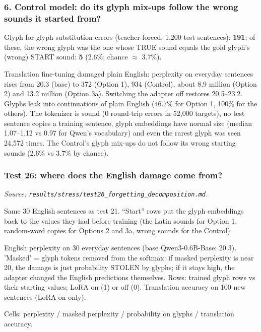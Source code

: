 \documentclass[10pt,a4paper,oneside]{article}
\begin{document}
\subsubsection*{6. Control model: do its glyph mix-ups follow the wrong sounds it started from?}

Glyph-for-glyph substitution errors (teacher-forced, 1,200 test sentences): \textbf{191}; of these, the wrong glyph was the one whose TRUE sound equals the gold glyph's (wrong) START sound: \textbf{5} (2.6\%; chance $\approx$ 3.7\%).

\begin{infer}Translation fine-tuning damaged plain English: perplexity on everyday sentences rises from 20.3 (base) to 372
(Option 1), 934 (Control), about 8.9 million (Option 2) and 13.2 million (Option 3a). Switching the adapter off
restores 20.5--23.2. Glyphs leak into continuations of plain English (46.7\% for Option 1, 100\% for the others).
The tokenizer is sound (0 round-trip errors in 52,000 targets), no test sentence copies a training sentence, glyph
embeddings have normal size (median 1.07--1.12 vs 0.97 for Qwen's vocabulary) and even the rarest glyph was seen
24,572 times. The Control's glyph mix-ups do not follow its wrong starting sounds (2.6\% vs 3.7\% by chance).\end{infer}
\subsubsection{Test 26: where does the English damage come from?}
\textit{Source: \texttt{results/stress/test26\_forgetting\_decomposition.md}.}


\begin{caveat}Same 30 English sentences as test 21. ``Start'' rows put the glyph embeddings back to the values they had
before training (the Latin sounds for Option 1, random-word copies for Options 2 and 3a, wrong sounds for the
Control).\end{caveat}
English perplexity on 30 everyday sentences (base Qwen3-0.6B-Base: 20.3). 'Masked' = glyph tokens removed from the softmax: if masked perplexity is near 20, the damage is just probability STOLEN by glyphs; if it stays high, the adapter changed the English predictions themselves. Rows: trained glyph rows vs their starting values; LoRA on (1) or off (0). Translation accuracy on 100 new sentences (LoRA on only).

Cells: perplexity / masked perplexity / probability on glyphs / translation accuracy.
\end{document}
